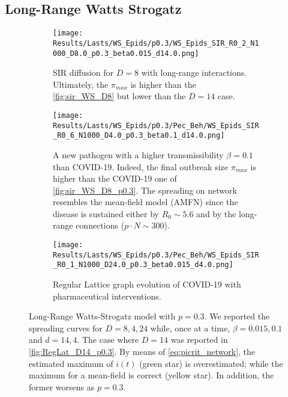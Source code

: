 \documentclass[a4paper,10pt, oneside]{book} %
\theoremstyle{definition}
\begin{document}
\subsection{Long-Range Watts Strogatz}
\begin{figure}[H]
    \centering
	\begin{subfigure}[t]{\textwidth}
        \centering
        \texttt{[image: Results/Lasts/WS\_Epids/p0.3/WS\_Epids\_SIR\_R0\_2\_N1000\_D8.0\_p0.3\_beta0.015\_d14.0.png]} 
        \caption{SIR diffusion for $ D = 8$ with long-range interactions. Ultimately, the $ \pi_{max} $ is higher than the \autoref{fig:sir_WS_D8} but lower than the $ D = 14$ case.} 
		\label{fig:sir_WS_D8_p0.3}
    \end{subfigure}
	\vfill
	\begin{subfigure}[t]{\textwidth}
        \centering
        \texttt{[image: Results/Lasts/WS\_Epids/p0.3/Pec\_Beh/WS\_Epids\_SIR\_R0\_6\_N1000\_D4.0\_p0.3\_beta0.1\_d14.0.png]}
        \caption{A new pathogen with a higher transmissibility $ \beta = 0.1$ than COVID-19. Indeed, the final outbreak size $\pi_{max} $ is higher than the COVID-19 one of \autoref{fig:sir_WS_D8_p0.3}.
		The spreading on network resembles the mean-field model (AMFN) since the disease is sustained either by $R_0 \sim 5.6$ and by the long-range connections ($p \cdot N \sim 300$).} 
		\label{fig:sir_WS_D4_b0.1_p0.3}
    \end{subfigure}
	\vfill
    \begin{subfigure}[t]{\textwidth}
        \centering
        \texttt{[image: Results/Lasts/WS\_Epids/p0.3/Pec\_Beh/WS\_Epids\_SIR\_R0\_1\_N1000\_D24.0\_p0.3\_beta0.015\_d4.0.png]} 
        \caption{Regular Lattice graph evolution of COVID-19 with pharmaceutical interventions.} 
		\label{fig:sir_WS_D24_d4_p0.3}
    \end{subfigure}
    \caption{Long-Range Watts-Strogatz model with $ p = 0.3$. We reported the spreading curves for $D = 8, 4, 24$ while, once at a time, $ \beta = 0.015, 0.1$ and $ d = 14,4$. The case where $ D = 14$ was reported in \autoref{fig:RegLat_D14_p0.3}. By means of \autoref{eq:picrit_network}, the estimated maximum of $ i(t)$ (green star) is overestimated; while the maximum for a mean-field is correct (yellow star). In addition, the former worsens as $ p = 0.3$.}
	\label{fig:sir_WS_D5D5b0.1_D24d4_p0.3}
\end{figure}

\clearpage
\restoregeometry
\end{document}
